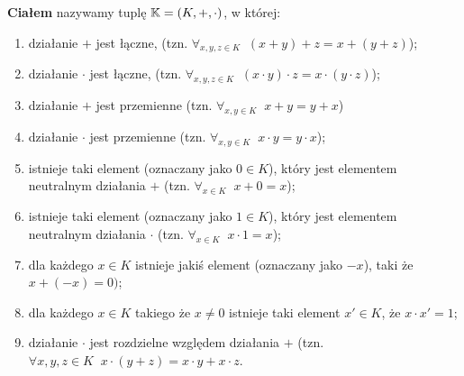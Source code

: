 \begin{definition}
	\textbf{Ciałem} nazywamy tuplę \( \mathbb{K} = (K, +, \cdot) \), w której:

	\begin{enumerate}
		\item działanie \( + \) jest łączne, (tzn. \(\forall_{x, y, z \in K} \; \;  (x + y) + z = x + (y + z) \));
		\item działanie \( \cdot \) jest łączne, (tzn. \(\forall_{x, y, z \in K} \; \;  (x \cdot y) \cdot z = x \cdot (y \cdot z) \));
		\item działanie \( + \) jest przemienne (tzn. \( \forall_{x, y \in K} \; \; x + y = y + x \))
		\item działanie \( \cdot \) jest przemienne (tzn. \( \forall_{x, y \in K} \; \; x \cdot y = y \cdot x \));
		\item istnieje taki element (oznaczany jako \(0 \in K\)), który jest elementem neutralnym działania \(+\) (tzn. \( \forall_{x \in K} \; \; x + 0 = x\));
		\item istnieje taki element (oznaczany jako \(1 \in K\)), który jest elementem neutralnym działania \(\cdot\) (tzn. \( \forall_{x \in K} \; \; x \cdot 1 = x\));
		\item dla każdego \( x \in K\) istnieje jakiś element (oznaczany jako \(-x\)), taki że \(x + (-x) = 0)\);
		\item dla każdego \( x \in K\) takiego że \( x \not= 0\) istnieje taki element \(x' \in K\), że \(x \cdot x' = 1\);
		\item działanie \( \cdot \) jest rozdzielne względem działania \( + \) (tzn. \( \forall{x,y,z \in K} \;\; x \cdot (y+z) =  x \cdot y + x \cdot z\).

	\end{enumerate}

\end{definition}
